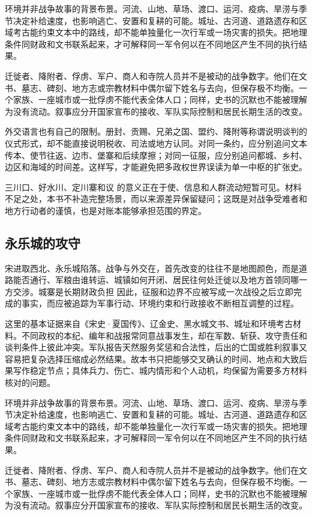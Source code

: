 环境并非战争故事的背景布景。河流、山地、草场、渡口、运河、疫病、旱涝与季节决定补给速度，也影响逃亡、安置和复耕的可能。城址、古河道、道路遗存和区域考古能约束文本中的路线，却不能单独量化一次行军或一场灾害的损失。把地理条件同财政和文书联系起来，才可解释同一军令何以在不同地区产生不同的执行结果。

迁徙者、降附者、俘虏、军户、商人和寺院人员并不是被动的战争数字。他们在文书、墓志、碑刻、地方志或宗教材料中偶尔留下姓名与去向，但保存极不均衡。一个家族、一座城市或一批俘虏不能代表全体人口；同样，史书的沉默也不能被理解为没有流动。叙事应分开国家宣布的接收、军队实际控制和居民长期生活的改变。

外交语言也有自己的限制。册封、贡赐、兄弟之国、盟约、降附等称谓说明谈判的仪式形式，却不能直接说明税收、司法或地方认同。对同一条约，应分别追问文本传本、使节往返、边市、堡寨和后续摩擦；对同一征服，应分别追问都城、乡村、边区和海域的时间差。这样写，才能避免把多政权世界误读为单一中枢的扩张史。

三川口、好水川、定川寨和议 的意义正在于使、信息和人群流动短暂可见。材料不足之处，本书不补造完整场景，而以来源差异保留疑问；这既是对战争受难者和地方行动者的谨慎，也是对账本能够承担范围的界定。

\subsection{永乐城的攻守}

宋进取西北、永乐城陷落。战争与外交在，首先改变的往往不是地图颜色，而是道路能否通行、军粮由谁转运、城镇如何开闭、居民往何处迁徙以及地方首领同哪一方交涉。城寨是长期财政负担 因此，征服和边界不应被写成一次战役之后立即完成的事实，而应被追踪为军事行动、环境约束和行政接收不断相互调整的过程。

这里的基本证据来自《宋史·夏国传》、辽金史、黑水城文书、城址和环境考古材料。不同政权的本纪、编年和战报常同意战事发生，却在军数、斩获、攻守责任和谈判条件上彼此冲突。军队报告天然服务奖惩和合法性，后出的亡国或胜利叙事又容易把复杂选择压缩成必然结果。故本书只把能够交叉确认的时间、地点和大致后果写作稳定节点；具体兵力、伤亡、城内情形和个人动机，均保留为需要多方材料核对的问题。

环境并非战争故事的背景布景。河流、山地、草场、渡口、运河、疫病、旱涝与季节决定补给速度，也影响逃亡、安置和复耕的可能。城址、古河道、道路遗存和区域考古能约束文本中的路线，却不能单独量化一次行军或一场灾害的损失。把地理条件同财政和文书联系起来，才可解释同一军令何以在不同地区产生不同的执行结果。

迁徙者、降附者、俘虏、军户、商人和寺院人员并不是被动的战争数字。他们在文书、墓志、碑刻、地方志或宗教材料中偶尔留下姓名与去向，但保存极不均衡。一个家族、一座城市或一批俘虏不能代表全体人口；同样，史书的沉默也不能被理解为没有流动。叙事应分开国家宣布的接收、军队实际控制和居民长期生活的改变。

